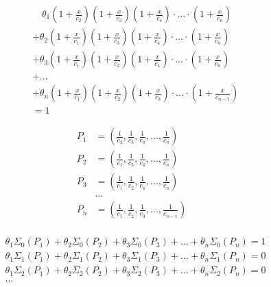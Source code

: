 \begin{equation*} \begin{aligned}
&\phantom{\quad} 
  \theta_1
  \left(1 + \frac{x}{c_2} \right)
  \left(1 + \frac{x}{c_3} \right)
  \left(1 + \frac{x}{c_4} \right)
  \cdot \ldots \cdot
  \left(1 + \frac{x}{c_n} \right) \\ &
+ \theta_2
  \left(1 + \frac{x}{c_1} \right)
  \left(1 + \frac{x}{c_3} \right)
  \left(1 + \frac{x}{c_4} \right)
  \cdot \ldots \cdot
  \left(1 + \frac{x}{c_n} \right) \\ &
+ \theta_3
  \left(1 + \frac{x}{c_1} \right)
  \left(1 + \frac{x}{c_2} \right)
  \left(1 + \frac{x}{c_4} \right)
  \cdot \ldots \cdot
  \left(1 + \frac{x}{c_n} \right) \\ &
+ \ldots \\ &
+ \theta_n
  \left(1 + \frac{x}{c_1} \right)
  \left(1 + \frac{x}{c_2} \right)
  \left(1 + \frac{x}{c_3} \right)
  \cdot \ldots \cdot
  \left(1 + \frac{x}{c_{n - 1}} \right) \\ &
= 1
\end{aligned} \end{equation*}

\begin{equation*} \begin{aligned}
P_1 &=
  \left( 
  \frac{1}{c_2},
  \frac{1}{c_3}, 
  \frac{1}{c_4}, 
  {} \ldots, 
  \frac{1}{c_n}
  \right) \\
P_2 &=
  \left( 
  \frac{1}{c_1},
  \frac{1}{c_3}, 
  \frac{1}{c_4}, 
  {} \ldots, 
  \frac{1}{c_n}
  \right) \\
P_3 &=
  \left( 
  \frac{1}{c_1},
  \frac{1}{c_2}, 
  \frac{1}{c_4}, 
  {} \ldots, 
  \frac{1}{c_n}
  \right) \\
&\ldots \\
P_n &=
  \left( 
  \frac{1}{c_1},
  \frac{1}{c_2}, 
  \frac{1}{c_3}, 
  {} \ldots, 
  \frac{1}{c_{n - 1}}
  \right) \\
\end{aligned} \end{equation*}

\begin{equation*} \begin{aligned}
& \theta_1 \Sigma_0(P_1)
+ \theta_2 \Sigma_0(P_2)
+ \theta_3 \Sigma_0(P_3)
+ \ldots
+ \theta_n \Sigma_0(P_n)
= 1 \\
& \theta_1 \Sigma_1(P_1)
+ \theta_2 \Sigma_1(P_2)
+ \theta_3 \Sigma_1(P_3)
+ \ldots
+ \theta_n \Sigma_1(P_n)
= 0 \\
& \theta_1 \Sigma_2(P_1)
+ \theta_2 \Sigma_2(P_2)
+ \theta_3 \Sigma_2(P_3)
+ \ldots
+ \theta_n \Sigma_2(P_n)
= 0 \\
& \ldots \\
\end{aligned} \end{equation*}

